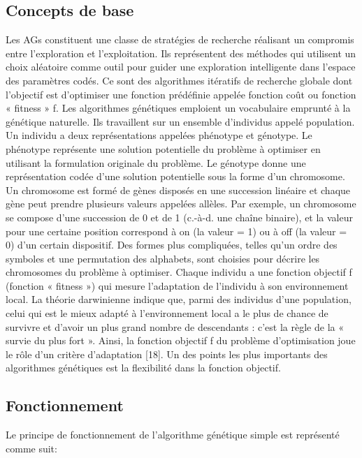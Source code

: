 \documentclass[12pt,a4paper]{article}
\begin{document}
	\subsection{Concepts de base}
	Les AGs constituent une classe de stratégies de recherche réalisant un compromis entre l’exploration et l’exploitation. Ils représentent des méthodes qui utilisent
un choix aléatoire comme outil pour guider une exploration intelligente dans l’espace des paramètres codés. Ce sont des algorithmes itératifs de recherche globale dont l’objectif est d’optimiser une fonction prédéfinie appelée fonction coût ou fonction « fitness » f.
	Les algorithmes génétiques emploient un vocabulaire emprunté à la génétique naturelle. Ils travaillent sur un ensemble d’individus appelé population. Un individu a deux représentations appelées phénotype et génotype. Le phénotype représente une solution potentielle du problème à optimiser en utilisant la formulation originale du problème. Le génotype donne une représentation codée
d’une solution potentielle sous la forme d’un chromosome. Un chromosome est formé de gènes disposés en une succession linéaire et chaque gène peut prendre plusieurs
valeurs appelées allèles. Par exemple, un chromosome se compose d’une succession de 0 et de 1 (c.-à-d. une chaîne binaire), et la valeur pour une certaine position correspond à on (la valeur = 1) ou à off (la valeur = 0) d’un certain dispositif. Des formes plus compliquées, telles qu’un ordre des symboles et une permutation des alphabets, sont choisies pour décrire les chromosomes du problème à optimiser. Chaque individu a une fonction objectif f (fonction « fitness ») qui mesure l’adaptation de l’individu à son environnement local. La théorie darwinienne indique que, parmi des individus d’une population, celui qui est le mieux adapté à l’environnement local a le plus de chance de survivre et d’avoir un plus grand nombre de descendants : c’est la règle de la « survie du plus fort ». Ainsi, la
fonction objectif f du problème d’optimisation joue le rôle d’un critère d’adaptation [18]. Un des points les plus importants des algorithmes génétiques est la flexibilité dans la fonction objectif.

	\subsection{Fonctionnement}
	
	Le principe de fonctionnement de l'algorithme génétique simple est représenté comme suit: \\
	 
\end{document}
